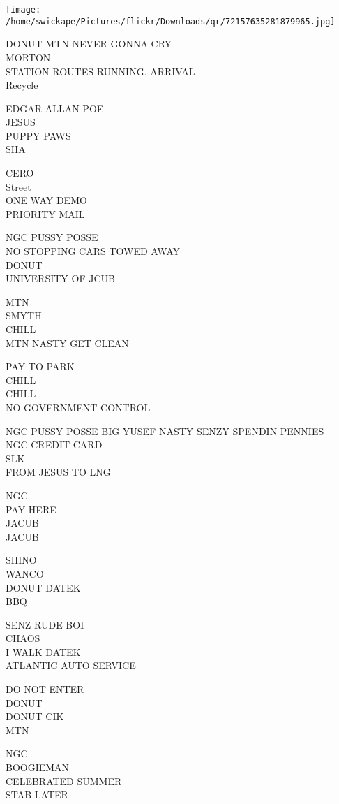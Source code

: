 \documentclass[10pt,letterpaper]{article}
\begin{document}
\texttt{[image: /home/swickape/Pictures/flickr/Downloads/qr/72157635281879965.jpg]}


DONUT MTN NEVER GONNA CRY\\
MORTON\\
STATION ROUTES RUNNING. ARRIVAL\\
Recycle

EDGAR ALLAN POE\\
JESUS\\
PUPPY PAWS\\
SHA

CERO\\
Street\\
ONE WAY DEMO\\
PRIORITY MAIL

NGC PUSSY POSSE\\
NO STOPPING CARS TOWED AWAY\\
DONUT\\
UNIVERSITY OF JCUB

MTN\\
SMYTH\\
CHILL\\
MTN NASTY GET CLEAN

PAY TO PARK\\
CHILL\\
CHILL\\
NO GOVERNMENT CONTROL

NGC PUSSY POSSE BIG YUSEF NASTY SENZY SPENDIN PENNIES\\
NGC CREDIT CARD\\
SLK\\
FROM JESUS TO LNG

NGC\\
PAY HERE\\
JACUB\\
JACUB

SHINO\\
WANCO\\
DONUT DATEK\\
BBQ

SENZ RUDE BOI\\
CHAOS\\
I WALK  DATEK\\
ATLANTIC AUTO SERVICE

DO NOT ENTER\\
DONUT\\
DONUT CIK\\
MTN

NGC\\
BOOGIEMAN\\
CELEBRATED SUMMER\\
STAB LATER
\end{document}
